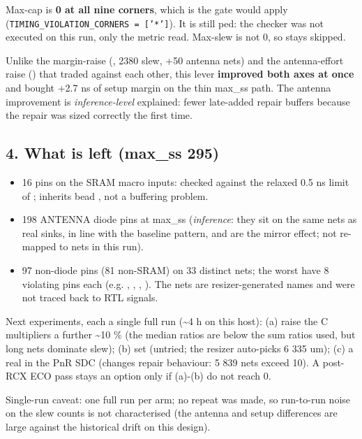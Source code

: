\begin{record}
Max-cap is \textbf{0 at all nine corners}, which is the gate
 would apply
(\texttt{TIMING\_\allowbreak{}VIOLATION\_\allowbreak{}CORNERS\ =\allowbreak{}\ ['*']}).
It is still ped: the checker was not executed on this run,
only the metric read. Max-slew is not 0, so
 stays skipped.

Unlike the margin-raise (, 2380 slew, +50 antenna nets) and
the antenna-effort raise () that traded against each other,
this lever \textbf{improved both axes at once} and bought +2.7 ns of
setup margin on the thin max\_ss path. The antenna improvement is
\emph{inference-level} explained: fewer late-added repair buffers
because the repair was sized correctly the first time.

\end{record}

\subsection{4. What is left (max\_ss 295)}\label{cr:defect:sky130-slew-cap-e45j:4-what-is-left-max-ss-295}

\begin{record}

\begin{itemize}
\tightlist
\item
  16 pins on the SRAM macro inputs: checked against the relaxed 0.5 ns
  limit of ; inherits bead , not
  a buffering problem.
\item
  198 ANTENNA diode pins at max\_ss (\emph{inference}: they sit on the
  same nets as real sinks, in line with the baseline pattern, and are
  the  mirror effect; not re-mapped to nets in this run).
\item
  97 non-diode pins (81 non-SRAM) on 33 distinct nets; the worst have 8
  violating pins each (e.g. , ,
  , ). The nets are
  resizer-generated names and were not traced back to RTL signals.
\end{itemize}

Next experiments, each a single full run (\textasciitilde4 h on this
host): (a) raise the C multipliers a further \textasciitilde10 \% (the
median ratios are below the sum ratios used, but long nets dominate
slew); (b) set  (untried; the
resizer auto-picks 6 335 um); (c) a real  in the
PnR SDC (changes repair behaviour: 5 839 nets exceed 10). A post-RCX ECO
pass stays an option only if (a)-(b) do not reach 0.

Single-run caveat: one full run per arm; no repeat was made, so
run-to-run noise on the slew counts is not characterised (the antenna
and setup differences are large against the historical drift on this
design).

\end{record}

